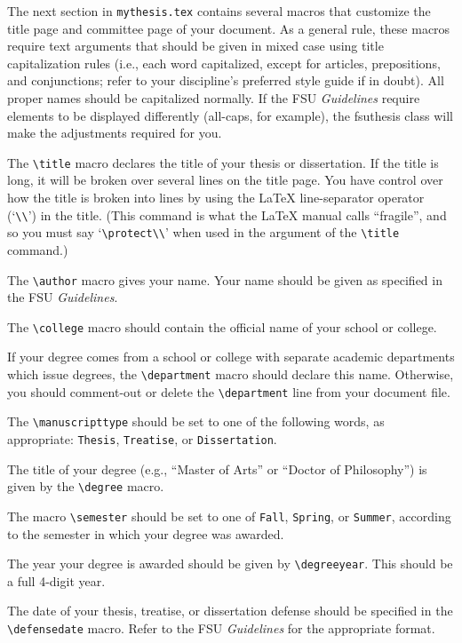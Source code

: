 \documentclass[11pt,letterpaper]{article}
\newcommand*{\booktitle}[1]{\textit{#1}}
\newcommand*{\complit}[1]{\texttt{#1}}
\newcommand*{\latexclass}[1]{\textsf{#1}}
\newcommand*{\fsuth}{\latexclass{fsuthesis}}
\renewcommand{\-}{\discretionary{}{}{}}
\begin{document}
The next section in \complit{mythesis.tex} contains several macros
that customize the title page and committee page of your document.  As
a general rule, these macros require text arguments that should be
given in mixed case using title capitalization rules (i.e., each word
capitalized, except for articles, prepositions, and conjunctions;
refer to your discipline's preferred style guide if in doubt).  All
proper names should be capitalized normally.  If the FSU
\booktitle{Guidelines} require elements to be displayed differently
(all-caps, for example), the \fsuth{} class will make the adjustments
required for you.

The \verb|\title| macro declares the title of your thesis or
dissertation.  If the title is long, it will be
broken over several lines on the title page.  You have control over
how the title is broken into lines by using the \LaTeX{}
line-separator operator (`\verb+\\+') in the title.  (This command is
what the \LaTeX{} manual calls ``fragile'', and so you must say
`\verb+\protect\\+' when used in the argument of the \verb|\title|
command.)

The \verb|\author| macro gives your name.  Your name should be
given as specified in the FSU \booktitle{Guidelines}.

The \verb|\college| macro should contain the official name of your
school or college.

If your degree comes from a school or college with separate academic
departments which issue degrees, the \verb|\department| macro should
declare this name.  Otherwise, you should comment-out or delete the
\verb|\department| line from your document file.

The \verb|\manuscripttype| should be set to one of the following words, as
appropriate: \complit{Thesis}, \complit{Treatise}, or
\complit{Dissertation}.

The title of your degree (e.g., ``Master of Arts'' or ``Doctor of
Philosophy'') is given by the \verb|\degree| macro.

The macro \verb|\semester| should be set to one of \complit{Fall},
\complit{Spring}, or \complit{Summer}, according to the semester in
which your degree was awarded.

The year your degree is awarded should be given by
\verb|\degreeyear|.  This should be a full 4-digit year.

The date of your thesis, treatise, or dissertation defense should be
specified in the \verb|\defensedate| macro.  Refer to the FSU
\booktitle{Guidelines} for the appropriate format.
\end{document}
